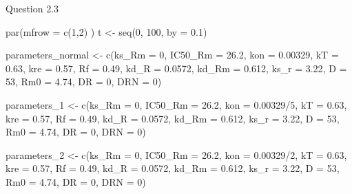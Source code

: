 \documentclass[
]{article}
\newenvironment{Shaded}{\begin{snugshade}}{\end{snugshade}}
\newcommand{\AttributeTok}[1]{\textcolor[rgb]{0.77,0.63,0.00}{#1}}
\newcommand{\DecValTok}[1]{\textcolor[rgb]{0.00,0.00,0.81}{#1}}
\newcommand{\FloatTok}[1]{\textcolor[rgb]{0.00,0.00,0.81}{#1}}
\newcommand{\FunctionTok}[1]{\textcolor[rgb]{0.00,0.00,0.00}{#1}}
\newcommand{\NormalTok}[1]{#1}
\newcommand{\OtherTok}[1]{\textcolor[rgb]{0.56,0.35,0.01}{#1}}
\newcommand{\SpecialCharTok}[1]{\textcolor[rgb]{0.00,0.00,0.00}{#1}}
\begin{document}
Question 2.3

\begin{Shaded}
\begin{Highlighting}[]
\FunctionTok{par}\NormalTok{(}\AttributeTok{mfrow =} \FunctionTok{c}\NormalTok{(}\DecValTok{1}\NormalTok{,}\DecValTok{2}\NormalTok{) )}
\NormalTok{t }\OtherTok{\textless{}{-}} \FunctionTok{seq}\NormalTok{(}\DecValTok{0}\NormalTok{, }\DecValTok{100}\NormalTok{, }\AttributeTok{by =} \FloatTok{0.1}\NormalTok{)}

\NormalTok{parameters\_normal }\OtherTok{\textless{}{-}} \FunctionTok{c}\NormalTok{(}\AttributeTok{ks\_Rm =} \DecValTok{0}\NormalTok{, }\AttributeTok{IC50\_Rm =} \FloatTok{26.2}\NormalTok{, }\AttributeTok{kon =} \FloatTok{0.00329}\NormalTok{,}
                \AttributeTok{kT =} \FloatTok{0.63}\NormalTok{, }\AttributeTok{kre =} \FloatTok{0.57}\NormalTok{, }\AttributeTok{Rf =} \FloatTok{0.49}\NormalTok{, }\AttributeTok{kd\_R =} \FloatTok{0.0572}\NormalTok{,}
                \AttributeTok{kd\_Rm =} \FloatTok{0.612}\NormalTok{, }\AttributeTok{ks\_r =} \FloatTok{3.22}\NormalTok{, }\AttributeTok{D =} \DecValTok{53}\NormalTok{, }\AttributeTok{Rm0 =} \FloatTok{4.74}\NormalTok{,}
                \AttributeTok{DR =} \DecValTok{0}\NormalTok{, }\AttributeTok{DRN =} \DecValTok{0}\NormalTok{)}

\NormalTok{parameters\_1 }\OtherTok{\textless{}{-}} \FunctionTok{c}\NormalTok{(}\AttributeTok{ks\_Rm =} \DecValTok{0}\NormalTok{, }\AttributeTok{IC50\_Rm =} \FloatTok{26.2}\NormalTok{, }\AttributeTok{kon =} \FloatTok{0.00329}\SpecialCharTok{/}\DecValTok{5}\NormalTok{,}
                \AttributeTok{kT =} \FloatTok{0.63}\NormalTok{, }\AttributeTok{kre =} \FloatTok{0.57}\NormalTok{, }\AttributeTok{Rf =} \FloatTok{0.49}\NormalTok{, }\AttributeTok{kd\_R =} \FloatTok{0.0572}\NormalTok{,}
                \AttributeTok{kd\_Rm =} \FloatTok{0.612}\NormalTok{, }\AttributeTok{ks\_r =} \FloatTok{3.22}\NormalTok{, }\AttributeTok{D =} \DecValTok{53}\NormalTok{, }\AttributeTok{Rm0 =} \FloatTok{4.74}\NormalTok{,}
                \AttributeTok{DR =} \DecValTok{0}\NormalTok{, }\AttributeTok{DRN =} \DecValTok{0}\NormalTok{)}

\NormalTok{parameters\_2 }\OtherTok{\textless{}{-}} \FunctionTok{c}\NormalTok{(}\AttributeTok{ks\_Rm =} \DecValTok{0}\NormalTok{, }\AttributeTok{IC50\_Rm =} \FloatTok{26.2}\NormalTok{, }\AttributeTok{kon =} \FloatTok{0.00329}\SpecialCharTok{/}\DecValTok{2}\NormalTok{,}
                \AttributeTok{kT =} \FloatTok{0.63}\NormalTok{, }\AttributeTok{kre =} \FloatTok{0.57}\NormalTok{, }\AttributeTok{Rf =} \FloatTok{0.49}\NormalTok{, }\AttributeTok{kd\_R =} \FloatTok{0.0572}\NormalTok{,}
                \AttributeTok{kd\_Rm =} \FloatTok{0.612}\NormalTok{, }\AttributeTok{ks\_r =} \FloatTok{3.22}\NormalTok{, }\AttributeTok{D =} \DecValTok{53}\NormalTok{, }\AttributeTok{Rm0 =} \FloatTok{4.74}\NormalTok{,}
                \AttributeTok{DR =} \DecValTok{0}\NormalTok{, }\AttributeTok{DRN =} \DecValTok{0}\NormalTok{)}


\end{Highlighting}
\end{Shaded}
\end{document}
